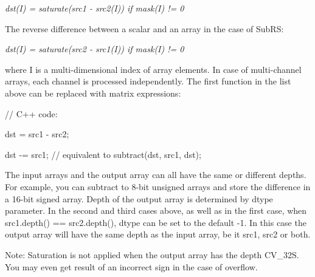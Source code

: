 {\itshape dst(\+I) = saturate(src1 -\/ src2(\+I)) if mask(\+I) != 0}


\begin{DoxyItemize}
\item The reverse difference between a scalar and an array in the case of {\ttfamily Sub\+RS}\+: 
\end{DoxyItemize}

{\itshape dst(\+I) = saturate(src2 -\/ src1(\+I)) if mask(\+I) != 0}

where {\ttfamily I} is a multi-\/dimensional index of array elements. In case of multi-\/channel arrays, each channel is processed independently. The first function in the list above can be replaced with matrix expressions\+: {\ttfamily }

{\ttfamily }

{\ttfamily }

{\ttfamily // C++ code\+:}

{\ttfamily }

{\ttfamily }

{\ttfamily dst = src1 -\/ src2;}

{\ttfamily }

{\ttfamily }

{\ttfamily dst -\/= src1; // equivalent to subtract(dst, src1, dst);}

{\ttfamily }

{\ttfamily }

{\ttfamily The input arrays and the output array can all have the same or different depths. For example, you can subtract to 8-\/bit unsigned arrays and store the difference in a 16-\/bit signed array. Depth of the output array is determined by {\ttfamily dtype} parameter. In the second and third cases above, as well as in the first case, when {\ttfamily src1.\+depth() == src2.\+depth()}, {\ttfamily dtype} can be set to the default {\ttfamily -\/1}. In this case the output array will have the same depth as the input array, be it {\ttfamily src1}, {\ttfamily src2} or both. }

Note\+: Saturation is not applied when the output array has the depth {\ttfamily C\+V\+\_\+32S}. You may even get result of an incorrect sign in the case of overflow.


